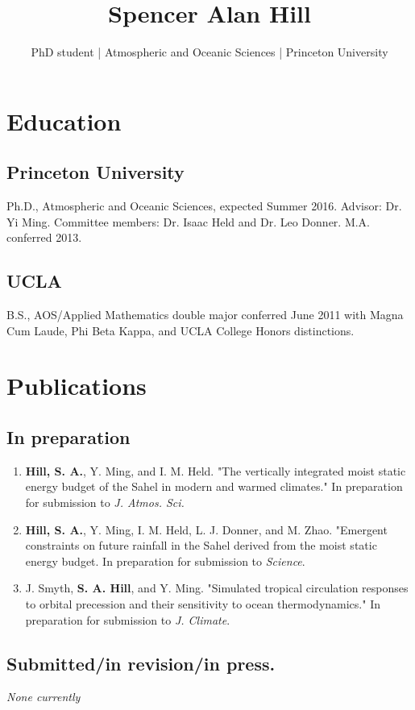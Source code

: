 \documentclass{article}
\author{PhD student | Atmospheric and Oceanic Sciences | Princeton University}
\date{}
\title{Spencer Alan Hill}
\begin{document}
\maketitle
\section*{Education}
\label{sec-1}
\subsection*{Princeton University}
\label{sec-1-1}
Ph.D., Atmospheric and Oceanic Sciences, expected Summer 2016.
Advisor: Dr. Yi Ming.  Committee members: Dr. Isaac Held and Dr. Leo Donner.
M.A. conferred 2013.
\subsection*{UCLA}
\label{sec-1-2}
B.S., AOS/Applied Mathematics double major conferred June 2011 with
Magna Cum Laude, Phi Beta Kappa, and UCLA College Honors distinctions.
\section*{Publications}
\label{sec-2}
\subsection*{In preparation}
\label{sec-2-1}
\begin{enumerate}
\item \textbf{Hill, S. A.}, Y. Ming, and I. M. Held.  "The vertically integrated moist
static energy budget of the Sahel in modern and warmed climates."  In
preparation for submission to \emph{J. Atmos. Sci.}
\item \textbf{Hill, S. A.}, Y. Ming, I. M. Held, L. J. Donner, and M. Zhao.  "Emergent
constraints on future rainfall in the Sahel derived from the moist static
energy budget.  In preparation for submission to \emph{Science}.
\item J. Smyth, \textbf{S. A. Hill}, and Y. Ming.  "Simulated tropical circulation responses to
orbital precession and their sensitivity to ocean thermodynamics."  In
preparation for submission to \emph{J. Climate}.
\end{enumerate}
\subsection*{Submitted/in revision/in press.}
\label{sec-2-2}
\emph{None currently}
\end{document}
